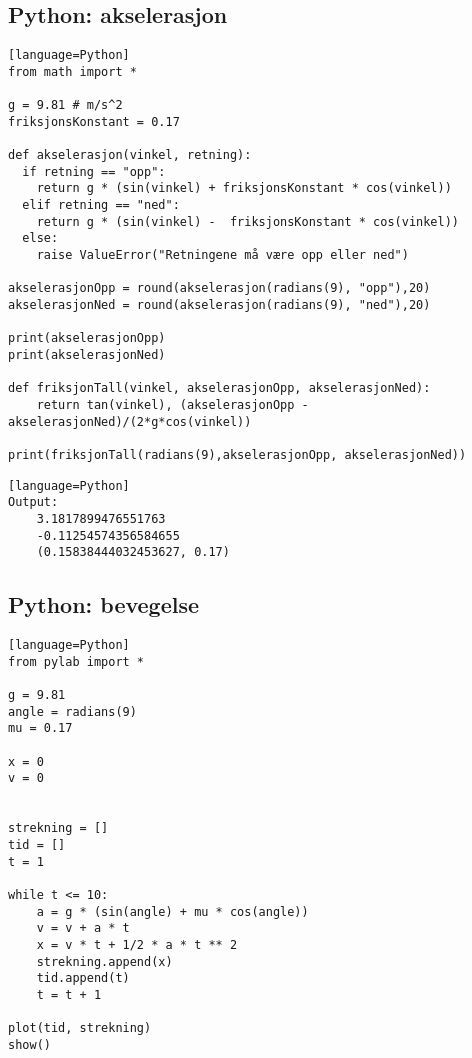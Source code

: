 \documentclass[a4paper]{article}
\begin{document}
\subsection{Python: akselerasjon} %
\label{sub:python}
\begin{lstlisting}[frame=single][language=Python]
from math import *

g = 9.81 # m/s^2
friksjonsKonstant = 0.17 

def akselerasjon(vinkel, retning):
  if retning == "opp":
    return g * (sin(vinkel) + friksjonsKonstant * cos(vinkel))
  elif retning == "ned":
    return g * (sin(vinkel) -  friksjonsKonstant * cos(vinkel))
  else:
    raise ValueError("Retningene må være opp eller ned")

akselerasjonOpp = round(akselerasjon(radians(9), "opp"),20)
akselerasjonNed = round(akselerasjon(radians(9), "ned"),20)

print(akselerasjonOpp)
print(akselerasjonNed)

def friksjonTall(vinkel, akselerasjonOpp, akselerasjonNed):
    return tan(vinkel), (akselerasjonOpp - akselerasjonNed)/(2*g*cos(vinkel))

print(friksjonTall(radians(9),akselerasjonOpp, akselerasjonNed))
\end{lstlisting}
\begin{lstlisting}[frame=single][language=Python]
Output:
	3.1817899476551763 
	-0.11254574356584655
	(0.15838444032453627, 0.17)
\end{lstlisting}
\subsection{Python: bevegelse} %
\label{sub:bevegelse}
\begin{lstlisting}[frame=single][language=Python]
from pylab import * 

g = 9.81  
angle = radians(9) 
mu = 0.17 

x = 0
v = 0


strekning = []
tid = []
t = 1 

while t <= 10:
    a = g * (sin(angle) + mu * cos(angle))
    v = v + a * t 
    x = v * t + 1/2 * a * t ** 2
    strekning.append(x)
    tid.append(t)
    t = t + 1

plot(tid, strekning)
show()
\end{lstlisting}
\end{document}
